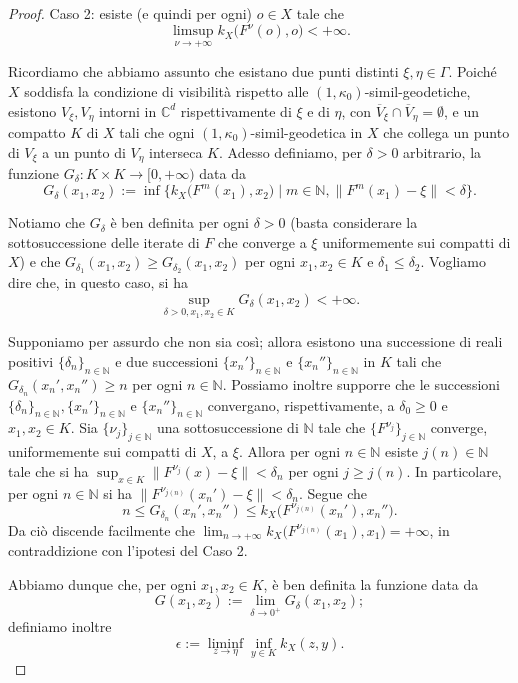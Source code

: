 \begin{proof}
    Caso 2: esiste (e quindi per ogni) $o \in X$ tale che
    $$\limsup_{\nu\longrightarrow+\infty} k_X\big(F^\nu(o),o\big)<+\infty.$$
    
    Ricordiamo che abbiamo assunto che esistano due punti distinti $\xi,\eta\in\Gamma$. Poiché $X$ soddisfa la condizione di visibilità rispetto alle $(1,\kappa_0)$-simil-geodetiche, esistono $V_\xi, V_\eta$ intorni in $\mathbb{C}^d$ rispettivamente di $\xi$ e di $\eta$, con $\overline{V}_\xi\cap\overline{V}_\eta=\emptyset$, e un compatto $K$ di $X$ tali che ogni $(1,\kappa_0)$-simil-geodetica in $X$ che collega un punto di $V_\xi$ a un punto di $V_\eta$ interseca $K$.
    Adesso definiamo, per $\delta>0$ arbitrario, la funzione $G_\delta:K\times K\longrightarrow [0,+\infty)$ data da
    $$G_\delta(x_1,x_2):=\inf\{k_X\big(F^m(x_1),x_2\big)\mid m\in\mathbb{N}, \|F^m(x_1)-\xi\|<\delta\}.$$

    Notiamo che $G_\delta$ è ben definita per ogni $\delta>0$ (basta considerare la sottosuccessione delle iterate di $F$ che converge a $\xi$ uniformemente sui compatti di $X$) e che $G_{\delta_1}(x_1,x_2) \ge G_{\delta_2}(x_1,x_2)$ per ogni $x_1,x_2 \in K$ e $\delta_1 \le \delta_2$. Vogliamo dire che, in questo caso, si ha
    $$\sup_{\delta>0,x_1,x_2\in K}G_\delta(x_1,x_2)<+\infty.$$

    Supponiamo per assurdo che non sia così; allora esistono una successione di reali positivi $\{\delta_n\}_{n\in\mathbb{N}}$ e due successioni $\{x_n'\}_{n\in\mathbb{N}}$ e $\{x_n''\}_{n\in\mathbb{N}}$ in $K$ tali che $G_{\delta_n}(x_n',x_n'') \ge n$ per ogni $n\in\mathbb{N}$. Possiamo inoltre supporre che le successioni $\{\delta_n\}_{n\in\mathbb{N}}, \{x_n'\}_{n\in\mathbb{N}}$ e $\{x_n''\}_{n\in\mathbb{N}}$ convergano, rispettivamente, a $\delta_0 \ge 0$ e $x_1,x_2\in K$. Sia $\{\nu_j\}_{j\in\mathbb{N}}$ una sottosuccessione di $\mathbb{N}$ tale che $\{F^{\nu_j}\}_{j\in\mathbb{N}}$ converge, uniformemente sui compatti di $X$, a $\xi$. Allora per ogni $n\in\mathbb{N}$ esiste $j(n)\in\mathbb{N}$ tale che si ha $\displaystyle\sup_{x\in K}\|F^{\nu_j}(x)-\xi\|<\delta_n$ per ogni $j \ge j(n)$. In particolare, per ogni $n \in \mathbb{N}$ si ha $\|F^{\nu_{j(n)}}(x_n')-\xi\|<\delta_n$. Segue che
    $$n \le G_{\delta_n}(x_n',x_n'') \le k_X\big(F^{\nu_{j(n)}}(x_n'),x_n''\big).$$
    Da ciò discende facilmente che $\displaystyle\lim_{n\longrightarrow+\infty}k_X\big(F^{\nu_{j(n)}}(x_1),x_1\big)=+\infty$, in contraddizione con l'ipotesi del Caso 2.

    Abbiamo dunque che, per ogni $x_1,x_2 \in K$, è ben definita la funzione data da
    $$G(x_1,x_2):=\lim_{\delta\longrightarrow 0^+}G_\delta(x_1,x_2);$$
    definiamo inoltre
    $$\epsilon:=\liminf_{z \longrightarrow\eta}\inf_{y\in K}k_X(z,y).$$
    

\end{proof}
